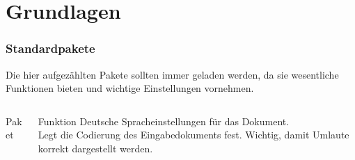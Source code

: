 \section{Grundlagen}
\begin{frame}[fragile]
    \frametitle{Standardpakete}
    Die hier aufgezählten Pakete sollten immer geladen werden, da sie wesentliche Funktionen bieten und wichtige Einstellungen vornehmen.
    \begin{columns}[T]
        \begin{column}{0.47\textwidth}
            \begin{block}{Paket}
                \begin{lstverbatim}
                \usepackage[ngerman]{babel}

                \usepackage[utf8]{luainputenc}
                \end{lstverbatim}
            \end{block}
        \end{column}
        \begin{column}{0.47\textwidth}
            \begin{block}{Funktion}
                Deutsche Spracheinstellungen für das Dokument. \\
                Legt die Codierung des Eingabedokuments fest. Wichtig, damit Umlaute korrekt dargestellt werden.

            \end{block}
        \end{column}
    \end{columns}
\end{frame}
